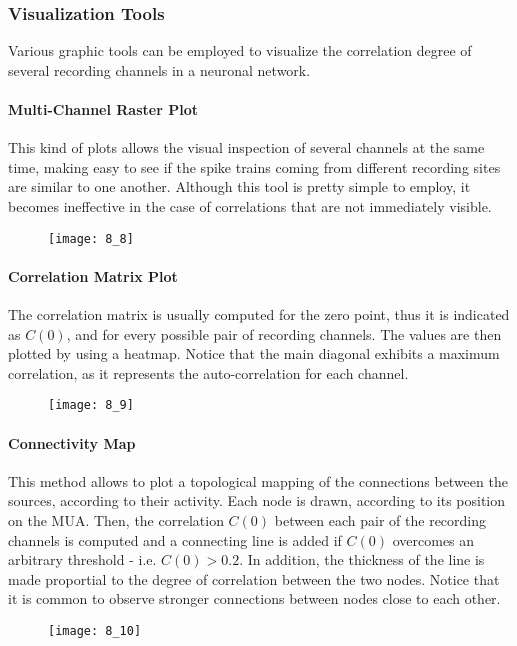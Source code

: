 \subsubsection{Visualization Tools}
Various graphic tools can be employed to visualize the correlation degree of several
recording channels in a neuronal network.
\paragraph{Multi-Channel Raster Plot} This kind of plots allows the visual inspection
of several channels at the same time, making easy to see if the spike trains coming
from different recording sites are similar to one another. Although this tool is
pretty simple to employ, it becomes ineffective in the case of correlations that are
not immediately visible.
\begin{figure}[H]
    \texttt{[image: 8\_8]}
    \centering
\end{figure}
\paragraph{Correlation Matrix Plot} The correlation matrix is usually computed for
the zero point, thus it is indicated as \(C(0)\), and for every possible pair of
recording channels. The values are then plotted by using a heatmap. Notice that the
main diagonal exhibits a maximum correlation, as it represents the auto-correlation
for each channel.
\begin{figure}[H]
    \texttt{[image: 8\_9]}
    \centering
\end{figure}
\paragraph{Connectivity Map} This method allows to plot a topological mapping of the
connections between the sources, according to their activity. Each node is drawn,
according to its position on the MUA. Then, the correlation \(C(0)\) between each pair
of the recording channels is computed and a connecting line is added if \(C(0)\)
overcomes an arbitrary threshold - i.e. \(C(0)>0.2\). In addition, the thickness of
the line is made proportial to the degree of correlation between the two nodes.
Notice that it is common to observe stronger connections between nodes close to
each other.
\begin{figure}[H]
    \texttt{[image: 8\_10]}
    \centering
\end{figure}
